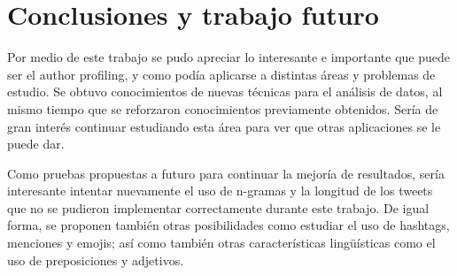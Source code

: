 \documentclass[11pt,a4paper]{article}
\begin{document}
\section{Conclusiones y trabajo futuro}

Por medio de este trabajo se pudo apreciar lo interesante e importante que puede ser el author profiling, y como podía aplicarse a distintas áreas y problemas de estudio. Se obtuvo conocimientos de nuevas técnicas para el análisis de datos, al mismo tiempo que se reforzaron conocimientos previamente obtenidos. Sería de gran interés continuar estudiando esta área para ver que otras aplicaciones se le puede dar.

Como pruebas propuestas a futuro para continuar la mejoría de resultados, sería interesante intentar nuevamente el uso de n-gramas y la longitud de los tweets que no se pudieron implementar correctamente durante este trabajo. De igual forma, se proponen también otras posibilidades como estudiar el uso de hashtags, menciones y emojis; así como también otras características lingüísticas como el uso de preposiciones y adjetivos.
\end{document}
